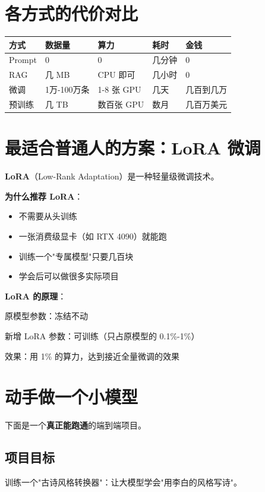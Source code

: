 \documentclass[12pt,UTF8]{ctexbook}
\begin{document}
\section{各方式的代价对比}

\begin{tabular}{|l|l|l|l|l|}
\hline
\textbf{方式} & \textbf{数据量} & \textbf{算力} & \textbf{耗时} & \textbf{金钱} \\
\hline
Prompt & 0 & 0 & 几分钟 & 0 \\
RAG & 几 MB & CPU 即可 & 几小时 & 0 \\
微调 & 1万-100万条 & 1-8 张 GPU & 几天 & 几百到几万 \\
预训练 & 几 TB & 数百张 GPU & 数月 & 几百万美元 \\
\hline
\end{tabular}

\section{最适合普通人的方案：LoRA 微调}

\textbf{LoRA}（Low-Rank Adaptation）是一种轻量级微调技术。

\textbf{为什么推荐 LoRA}：
\begin{itemize}
  \item 不需要从头训练
  \item 一张消费级显卡（如 RTX 4090）就能跑
  \item 训练一个"专属模型"只要几百块
  \item 学会后可以做很多实际项目
\end{itemize}

\textbf{LoRA 的原理}：

原模型参数：冻结不动

新增 LoRA 参数：可训练（只占原模型的 0.1\%-1\%）

效果：用 1\% 的算力，达到接近全量微调的效果

\section{动手做一个小模型}

下面是一个\textbf{真正能跑通}的端到端项目。

\subsection{项目目标}

训练一个"古诗风格转换器"：让大模型学会"用李白的风格写诗"。
\end{document}
